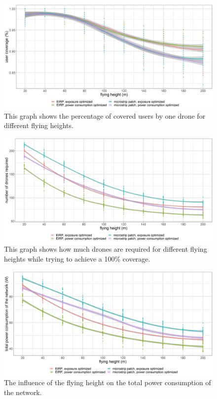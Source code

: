 \begin{figure}[]
  \includegraphics[width=\textwidth]{../results/s3/fhvscov.png}
  \caption{This graph shows the percentage of covered users by one drone for different flying heights.}
  \label{fig:s3fhvscov}
\end{figure}

\begin{figure}[]
  \includegraphics[width=\textwidth]{../results/s3/fhvsnumdrones.png}
  \caption{This graph shows how much drones are required for different flying heights while trying to achieve a 100\% coverage.}
  \label{fig:s3fhvscov}
\end{figure}

\begin{figure}[h!]
  \includegraphics[width=\textwidth]{../results/s3/fhvspc.png}
  \caption{The influence of the flying height on the total power consumption of the network.}
  \label{fig:s3fhvspc}
\end{figure}

